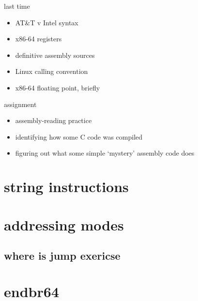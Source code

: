 \date{}
\title{}
\date{}

\begin{frame}
    \titlepage
\end{frame}



\begin{frame}{last time}
    \begin{itemize}
    \item AT\&T v Intel syntax
    \item x86-64 registers
    \item definitive assembly sources
    \item Linux calling convention
    \item x86-64 floating point, briefly
    \end{itemize}
\end{frame}

\begin{frame}{assignment}
    \begin{itemize}
    \item assembly-reading practice
    \item identifying how some C code was compiled
    \item figuring out what some simple `mystery' assembly code does
    \end{itemize}
\end{frame}

\section{string instructions}


\section{addressing modes} %



\subsection{where is jump exericse}



\section{endbr64}

